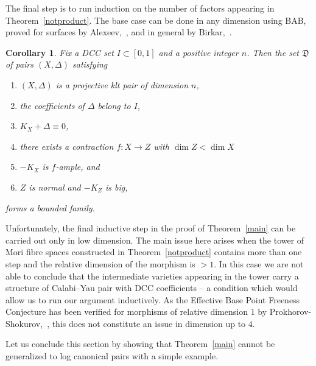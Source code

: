 \documentclass{amsart}[12pt,a4paper]
\newtheorem{corollary}[theorem]{Corollary}
\theoremstyle{definition}
\begin{document}
The final step is to run induction on the number of factors appearing in Theorem~\ref{notproduct}. 
The base case can be done in any dimension using BAB, proved for surfaces by Alexeev,~\cite{Ale94}, and in general by Birkar,~\cite{bir16bab}.

\begin{corollary}
\label{bounded.lcy.mfs.thm}
Fix a DCC set $I\subset [0,1]$ and a positive integer $n$.
Then the set $\mathfrak D$ of pairs $(X, \Delta)$ satisfying
\begin{enumerate}
\item 
$(X, \Delta )$ is a projective klt pair of dimension $n$,
\item 
the coefficients of $\Delta$ belong to $I$,
\item 
$K_X+\Delta \equiv 0$,
\item 
there exists a contraction $f\colon X\to Z$ with $\dim Z < \dim X$
\item 
$-K_X$ is $f$-ample, and
\item 
$Z$ is normal and $-K_Z$ is big,
\end{enumerate}
forms a bounded family.
\end{corollary}

Unfortunately, the final inductive step in the proof of Theorem~\ref{main} can be carried out only in low dimension. 
The main issue here arises when the tower of Mori fibre spaces constructed in Theorem~\ref{notproduct} contains more than one step and the relative dimension of the morphism is $>1$. 
In this case we are not able to conclude that the intermediate varieties appearing in the tower carry a structure of Calabi--Yau pair with DCC coefficients --  a condition which would allow us to run our argument inductively. 
As the Effective Base Point Freeness Conjecture has been verified for morphisms of relative dimension $1$ by Prokhorov-Shokurov,~\cite{PS}, this does not constitute an issue in dimension up to $4$. 

Let us conclude this section by showing that Theorem~\ref{main} cannot be generalized to log canonical pairs with a simple example.
\end{document}

